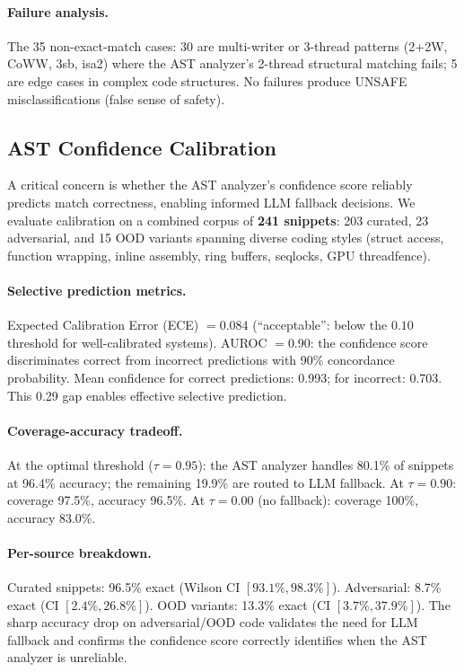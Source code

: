 \documentclass[11pt]{article}
\begin{document}
\paragraph{Failure analysis.}
The 35 non-exact-match cases: 30 are multi-writer or 3-thread
patterns (2+2W, CoWW, 3sb, isa2) where the AST analyzer's
2-thread structural matching fails; 5 are edge cases in
complex code structures. No failures produce UNSAFE
misclassifications (false sense of safety).

\subsection{AST Confidence Calibration}
\label{sec:calibration}

A critical concern is whether the AST analyzer's confidence score
reliably predicts match correctness, enabling informed LLM fallback
decisions.  We evaluate calibration on a combined corpus of \textbf{241 snippets}:
203 curated, 23 adversarial, and 15 OOD variants spanning diverse
coding styles (struct access, function wrapping, inline assembly,
ring buffers, seqlocks, GPU threadfence).

\paragraph{Selective prediction metrics.}
Expected Calibration Error (ECE) $= 0.084$ (``acceptable'': below
the $0.10$ threshold for well-calibrated systems).
AUROC $= 0.90$: the confidence score discriminates correct from
incorrect predictions with 90\% concordance probability.
Mean confidence for correct predictions: 0.993; for incorrect: 0.703.
This 0.29 gap enables effective selective prediction.

\paragraph{Coverage-accuracy tradeoff.}
At the optimal threshold ($\tau = 0.95$): the AST analyzer handles
80.1\% of snippets at 96.4\% accuracy; the remaining 19.9\% are
routed to LLM fallback.  At $\tau = 0.90$: coverage 97.5\%, accuracy
96.5\%.  At $\tau = 0.00$ (no fallback): coverage 100\%, accuracy 83.0\%.

\paragraph{Per-source breakdown.}
Curated snippets: 96.5\% exact (Wilson CI $[93.1\%, 98.3\%]$).
Adversarial: 8.7\% exact (CI $[2.4\%, 26.8\%]$).
OOD variants: 13.3\% exact (CI $[3.7\%, 37.9\%]$).
The sharp accuracy drop on adversarial/OOD code validates the
need for LLM fallback and confirms the confidence score correctly
identifies when the AST analyzer is unreliable.
\end{document}
